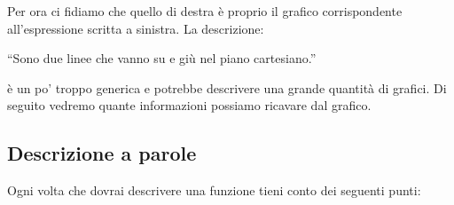 Per ora ci fidiamo che quello di destra è proprio il grafico corrispondente 
all'espressione scritta a sinistra.
La descrizione:
\vspace{-.5em}
\begin{center}
 ``Sono due linee che vanno su e giù nel piano cartesiano.''
\end{center}
\vspace{-.5em}
è un po' troppo generica e potrebbe descrivere una grande quantità di grafici.
Di seguito vedremo quante informazioni possiamo ricavare dal grafico.

\subsection{Descrizione a parole}

Ogni volta che dovrai descrivere una funzione tieni conto dei seguenti punti:

 
